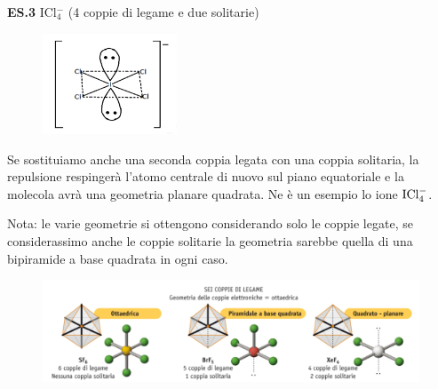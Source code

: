 \vspace{0.2cm}\textbf{ES.3} ICl$_4^-$ (4 coppie di legame e due solitarie)

\hspace{0.5cm}\begin{minipage}{0.2\textwidth}
    \begin{figure}[H]
    \includegraphics[width=4cm]{immagini/ICl_4.png}
    \end{figure}
    \end{minipage} \hfill
    \begin{minipage}{0.65\textwidth}
        \vspace{0.2cm}Se sostituiamo anche una seconda coppia legata con una coppia solitaria, la repulsione respingerà l'atomo centrale di nuovo sul piano equatoriale e la molecola avrà una geometria planare quadrata. Ne è un esempio lo ione $\rm ICl_4^-$.
    \end{minipage}

\vspace{0.2cm}Nota: le varie geometrie si ottengono considerando solo le coppie legate, se considerassimo anche le coppie solitarie la geometria sarebbe quella di una bipiramide a base quadrata in ogni caso.

\begin{figure}[htp]
    \centering
    \includegraphics[width=14cm]{immagini/geometrie-6-coppie.png}
\end{figure}